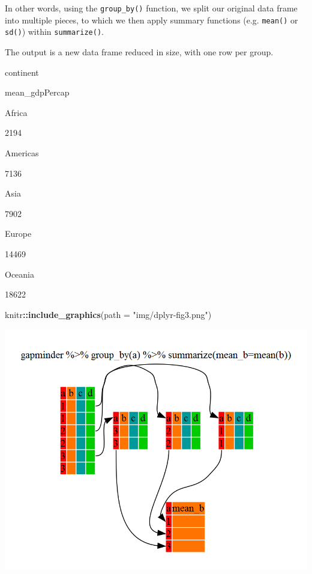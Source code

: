 \documentclass[]{book}
\newenvironment{Shaded}{\begin{snugshade}}{\end{snugshade}}
\newcommand{\DataTypeTok}[1]{\textcolor[rgb]{0.13,0.29,0.53}{#1}}
\newcommand{\KeywordTok}[1]{\textcolor[rgb]{0.13,0.29,0.53}{\textbf{#1}}}
\newcommand{\NormalTok}[1]{#1}
\newcommand{\OperatorTok}[1]{\textcolor[rgb]{0.81,0.36,0.00}{\textbf{#1}}}
\newcommand{\StringTok}[1]{\textcolor[rgb]{0.31,0.60,0.02}{#1}}
\begin{document}
In other words, using the \texttt{group\_by()} function, we split our original data frame into multiple pieces, to which we then apply summary functions (e.g. \texttt{mean()} or \texttt{sd()}) within \texttt{summarize()}.

The output is a new data frame reduced in size, with one row per group.

\begin{Shaded}
\end{Shaded}

continent

mean\_gdpPercap

Africa

2194

Americas

7136

Asia

7902

Europe

14469

Oceania

18622

\begin{Shaded}
\begin{Highlighting}[]
\NormalTok{knitr}\OperatorTok{::}\KeywordTok{include_graphics}\NormalTok{(}\DataTypeTok{path =} \StringTok{"img/dplyr-fig3.png"}\NormalTok{)}
\end{Highlighting}
\end{Shaded}

\begin{center}\includegraphics[width=0.7\linewidth]{img/dplyr-fig3} \end{center}
\end{document}
